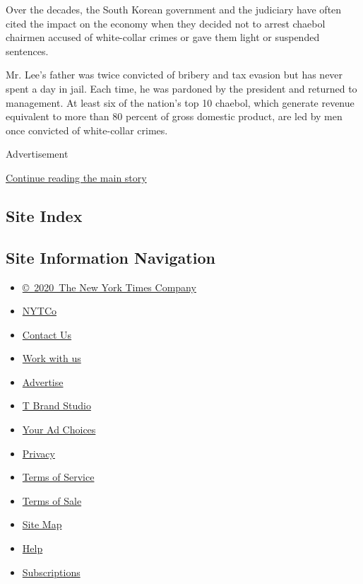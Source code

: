 Over the decades, the South Korean government and the judiciary have
often cited the impact on the economy when they decided not to arrest
chaebol chairmen accused of white-collar crimes or gave them light or
suspended sentences.

Mr. Lee's father was twice convicted of bribery and tax evasion but has
never spent a day in jail. Each time, he was pardoned by the president
and returned to management. At least six of the nation's top 10 chaebol,
which generate revenue equivalent to more than 80 percent of gross
domestic product, are led by men once convicted of white-collar crimes.

Advertisement

\protect\hyperlink{after-bottom}{Continue reading the main story}

\hypertarget{site-index}{%
\subsection{Site Index}\label{site-index}}

\hypertarget{site-information-navigation}{%
\subsection{Site Information
Navigation}\label{site-information-navigation}}

\begin{itemize}
\tightlist
\item
  \href{https://help.nytimes3xbfgragh.onion/hc/en-us/articles/115014792127-Copyright-notice}{©~2020~The
  New York Times Company}
\end{itemize}

\begin{itemize}
\tightlist
\item
  \href{https://www.nytco.com/}{NYTCo}
\item
  \href{https://help.nytimes3xbfgragh.onion/hc/en-us/articles/115015385887-Contact-Us}{Contact
  Us}
\item
  \href{https://www.nytco.com/careers/}{Work with us}
\item
  \href{https://nytmediakit.com/}{Advertise}
\item
  \href{http://www.tbrandstudio.com/}{T Brand Studio}
\item
  \href{https://www.nytimes3xbfgragh.onion/privacy/cookie-policy\#how-do-i-manage-trackers}{Your
  Ad Choices}
\item
  \href{https://www.nytimes3xbfgragh.onion/privacy}{Privacy}
\item
  \href{https://help.nytimes3xbfgragh.onion/hc/en-us/articles/115014893428-Terms-of-service}{Terms
  of Service}
\item
  \href{https://help.nytimes3xbfgragh.onion/hc/en-us/articles/115014893968-Terms-of-sale}{Terms
  of Sale}
\item
  \href{https://spiderbites.nytimes3xbfgragh.onion}{Site Map}
\item
  \href{https://help.nytimes3xbfgragh.onion/hc/en-us}{Help}
\item
  \href{https://www.nytimes3xbfgragh.onion/subscription?campaignId=37WXW}{Subscriptions}
\end{itemize}
